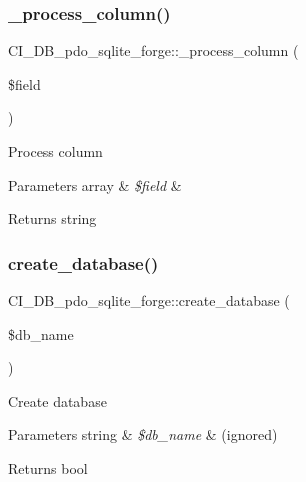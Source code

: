 \subsubsection{\texorpdfstring{\+\_\+process\+\_\+column()}{\_process\_column()}}
{\footnotesize\ttfamily C\+I\+\_\+\+D\+B\+\_\+pdo\+\_\+sqlite\+\_\+forge\+::\+\_\+process\+\_\+column (\begin{DoxyParamCaption}\item[{}]{\$field }\end{DoxyParamCaption})\hspace{0.3cm}{\ttfamily [protected]}}

Process column


\begin{DoxyParams}[1]{Parameters}
array & {\em \$field} & \\
\hline
\end{DoxyParams}
\begin{DoxyReturn}{Returns}
string 
\end{DoxyReturn}
\mbox{\label{class_c_i___d_b__pdo__sqlite__forge_a78d082ec6c0671949de9b489b6f5ad81}} 
\subsubsection{\texorpdfstring{create\+\_\+database()}{create\_database()}}
{\footnotesize\ttfamily C\+I\+\_\+\+D\+B\+\_\+pdo\+\_\+sqlite\+\_\+forge\+::create\+\_\+database (\begin{DoxyParamCaption}\item[{}]{\$db\+\_\+name }\end{DoxyParamCaption})}

Create database


\begin{DoxyParams}[1]{Parameters}
string & {\em \$db\+\_\+name} & (ignored) \\
\hline
\end{DoxyParams}
\begin{DoxyReturn}{Returns}
bool 
\end{DoxyReturn}
\mbox{\label{class_c_i___d_b__pdo__sqlite__forge_af66ce05b125dbe42af29445e54ba77c8}} 
